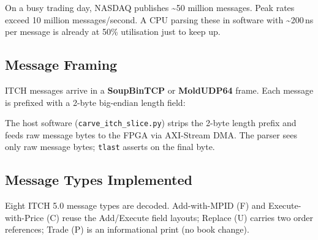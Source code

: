 \documentclass[11pt,a4paper]{article}
\begin{document}
On a busy trading day, NASDAQ publishes \textasciitilde{}50 million messages.
Peak rates exceed 10 million messages/second. A CPU parsing these in software
with \textasciitilde{}200\,ns per message is already at 50\% utilisation just to keep up.

\subsection{Message Framing}

ITCH messages arrive in a \textbf{SoupBinTCP} or \textbf{MoldUDP64} frame.
Each message is prefixed with a 2-byte big-endian length field:

\begin{center}
\end{center}

The host software (\texttt{carve\_itch\_slice.py}) strips the 2-byte length prefix
and feeds raw message bytes to the FPGA via AXI-Stream DMA.
The parser sees only raw message bytes; \texttt{tlast} asserts on the final byte.

\subsection{Message Types Implemented}

Eight ITCH 5.0 message types are decoded. Add-with-MPID (F) and
Execute-with-Price (C) reuse the Add/Execute field layouts; Replace (U) carries
two order references; Trade (P) is an informational print (no book change).
\end{document}
